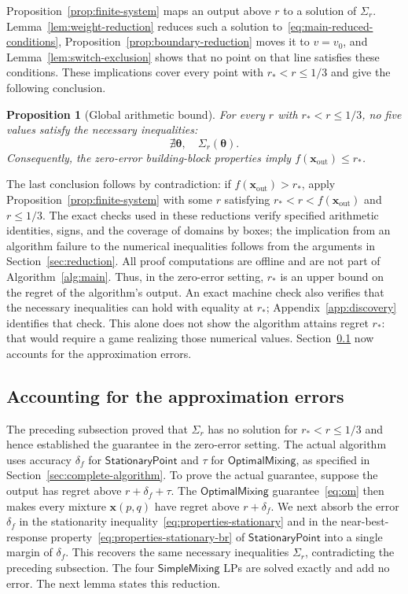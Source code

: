\documentclass[11pt]{article}
\newtheorem{proposition}[theorem]{Proposition}
\theoremstyle{remark}
\theoremstyle{plain}
\newcommand{\sm}{\mathsf{SimpleMixing}}
\newcommand{\om}{\mathsf{OptimalMixing}}
\newcommand{\spoint}{\mathsf{StationaryPoint}}
\begin{document}
Proposition~\ref{prop:finite-system} maps an output above $r$ to a
solution of $\Sigma_r$. Lemma~\ref{lem:weight-reduction} reduces
such a solution to~\eqref{eq:main-reduced-conditions},
Proposition~\ref{prop:boundary-reduction} moves it to $v=v_0$,
and Lemma~\ref{lem:switch-exclusion} shows that no point on that
line satisfies these conditions.
These implications cover every point with $r_*<r\le1/3$ and give
the following conclusion.
\begin{proposition}[Global arithmetic bound]
\label{prop:global-arithmetic}
For every $r$ with $r_*<r\le1/3$, no five values satisfy the
necessary inequalities:
\[
 \nexists\boldsymbol\theta,\quad\Sigma_r(\boldsymbol\theta).
\]
Consequently, the zero-error building-block properties imply
$f(\boldsymbol x_{\mathrm{out}})\le r_*$.
\end{proposition}
The last conclusion follows by contradiction: if
$f(\boldsymbol x_{\mathrm{out}})>r_*$, apply
Proposition~\ref{prop:finite-system} with some $r$ satisfying
$r_*<r<f(\boldsymbol x_{\mathrm{out}})$ and $r\le1/3$.
The exact checks used in these reductions verify specified arithmetic
identities, signs, and the coverage of domains by boxes; the
implication from an algorithm failure to the numerical inequalities
follows from the arguments in
Section~\ref{sec:reduction}. All proof computations are offline and
are not part of Algorithm~\ref{alg:main}.
Thus, in the zero-error setting, $r_*$ is an upper bound on the
regret of the algorithm's output. An exact machine
check also verifies that the necessary inequalities can hold with
equality at $r_*$; Appendix~\ref{app:discovery} identifies that
check. This alone does not show the algorithm attains regret $r_*$:
that would require a game realizing those numerical values.
Section~\ref{sec:accuracy-transfer} now accounts for the approximation
errors.

\subsection{Accounting for the approximation errors}
\label{sec:accuracy-transfer}

The preceding subsection proved that $\Sigma_r$ has no solution for
$r_*<r\le1/3$ and hence established the guarantee in the zero-error
setting.
The actual algorithm uses accuracy $\delta_f$ for $\spoint$ and
$\tau$ for $\om$, as specified in Section~\ref{sec:complete-algorithm}.
To prove the actual guarantee, suppose the output has regret above
$r+\delta_f+\tau$. The $\om$ guarantee~\eqref{eq:om} then makes every
mixture $\boldsymbol x(p,q)$ have regret above $r+\delta_f$. We next
absorb the error $\delta_f$ in the stationarity
inequality~\eqref{eq:properties-stationary} and in the
near-best-response property~\eqref{eq:properties-stationary-br} of
$\spoint$ into a single margin of $\delta_f$. This recovers the same
necessary inequalities
$\Sigma_r$, contradicting the preceding subsection. The four
$\sm$ LPs are solved exactly and add no error. The next lemma
states this reduction.
\end{document}
